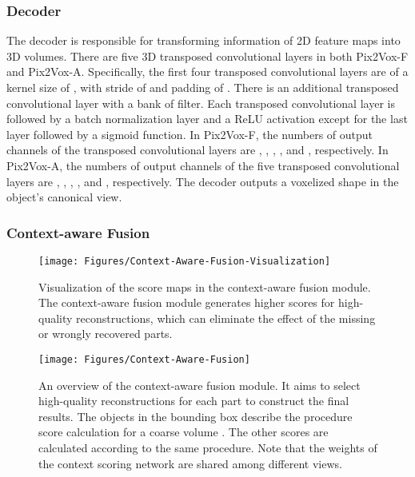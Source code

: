 \documentclass[10pt,twocolumn,letterpaper]{article}
\begin{document}
\vspace{-3 mm}
\subsubsection{Decoder}
\vspace{-1 mm}
The decoder is responsible for transforming information of 2D feature maps into 3D volumes.
There are five 3D transposed convolutional layers in both Pix2Vox-F and Pix2Vox-A.
Specifically, the first four transposed convolutional layers are of a kernel size of , with stride of  and padding of .
There is an additional transposed convolutional layer with a bank of  filter.
Each transposed convolutional layer is followed by a batch normalization layer and a ReLU activation except for the last layer followed by a sigmoid function.
In Pix2Vox-F, the numbers of output channels of the transposed convolutional layers are , , , , and , respectively.
In Pix2Vox-A, the numbers of output channels of the five transposed convolutional layers are , , , , and , respectively.
The decoder outputs a  voxelized shape in the object's canonical view.

\vspace{-3 mm}
\subsubsection{Context-aware Fusion}
\vspace{-1 mm}

\begin{figure}[!t]
  \centering
  \resizebox{\linewidth}{!} {
    \texttt{[image: Figures/Context-Aware-Fusion-Visualization]}
  }
  \caption{Visualization of the score maps in the context-aware fusion module. The context-aware fusion module generates higher scores for high-quality reconstructions, which can eliminate the effect of the missing or wrongly recovered parts.}
  \label{fig:context-aware-fusion-visualization}
\end{figure}

\begin{figure}
  \centering
  \resizebox{\linewidth}{!} {
    \texttt{[image: Figures/Context-Aware-Fusion]}
  }
  \caption{An overview of the context-aware fusion module. It aims to select high-quality reconstructions for each part to construct the final results. The objects in the bounding box describe the procedure score calculation for a coarse volume . The other scores are calculated according to the same procedure. Note that the weights of the context scoring network are shared among different views.}
  \label{fig:context-aware-fusion}
  \vspace{-2 mm}
\end{figure}
\end{document}
